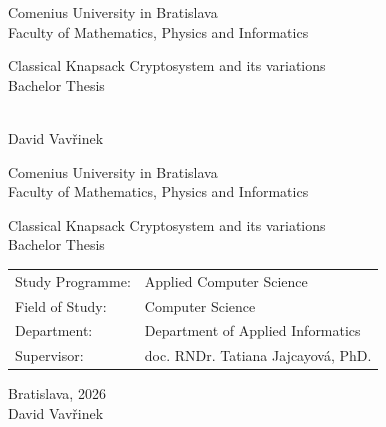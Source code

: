 \documentclass[12pt, twoside]{book}
\def\mfrok{2026}
\def\mfnazov{Classical Knapsack Cryptosystem and its variations}
\def\mftyp{Bachelor Thesis}
\def\mfautor{David Vavřinek}
\def\mfskolitel{doc. RNDr. Tatiana Jajcayová, PhD.}
\def\mfkonzultant{tit. Meno Priezvisko, tit. }
\def\mfmiesto{Bratislava, \mfrok}
\def\mfodbor{Computer Science}               %
\def\program{Applied Computer Science}  %
\def\mfpracovisko{Department of Applied Informatics}
\begin{document}
     
\frontmatter
\pagestyle{empty}


\begin{center}
  \sc\large
  Comenius University in Bratislava\\
  Faculty of Mathematics, Physics and Informatics

\vfill

{\LARGE\mfnazov}\\
\mftyp
\end{center}

\vfill

{\sc\large 
\noindent \mfrok\\
\mfautor
}

\cleardoublepage


\noindent

\begin{center}
\sc  
\large
  Comenius University in Bratislava\\
  Faculty of Mathematics, Physics and Informatics

\vfill

{\LARGE\mfnazov}\\
\mftyp
\end{center}

\vfill

\noindent
\begin{tabular}{ll}
Study Programme: & \program \\
Field of Study: & \mfodbor \\
Department: & \mfpracovisko \\
Supervisor: & \mfskolitel \\
\end{tabular}

\vfill


\noindent \mfmiesto\\
\mfautor

\cleardoublepage



\newpage
\setcounter{page}{2}

\end{document}
